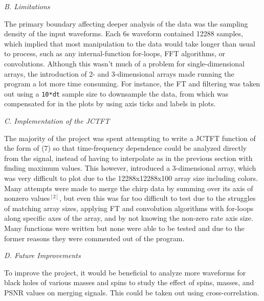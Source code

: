 \documentclass[12pt]{article}
\begin{document}
\begin{multicols}{2}
\begin{center}
    \textit{B. Limitations}\\
\end{center}

The primary boundary affecting deeper analysis of the data was the sampling density of the input waveforms. Each 6s waveform contained 12288 samples, which implied that most manipulation to the data would take longer than usual to process, such as any internal-function for-loops, FFT algorithms, or convolutions. Although this wasn't much of a problem for single-dimensional arrays, the introduction of 2- and 3-dimensional arrays made running the program a lot more time consuming. For instance, the FT and filtering was taken out using a \verb!10*dt! sample size to downsample the data, from which was compensated for in the plots by using axis ticks and labels in plots.

\vspace{5pt}

\begin{center}
    \textit{C. Implementation of the JCTFT}\\
\end{center}

\vspace{5pt}

The majority of the project was spent attempting to write a JCTFT function of the form of (7) so that time-frequency dependence could be analyzed directly from the signal, instead of having to interpolate as in the previous section with finding maximum values. This however, introduced a 3-dimensional array, which was very difficult to plot due to the 12288x12288x100 array size including colors. Many attempts were made to merge the chirp data by summing over its axis of nonzero values$^{[2]}$, but even this was far too difficult to test due to the struggles of matching array sizes, applying FT and convolution algorithms with for-loops along specific axes of the array, and by not knowing the non-zero rate axis size. Many functions were written but none were able to be tested and due to the former reasons they were commented out of the program.



\begin{center}
    \textit{D. Future Improvements}\\
\end{center}


To improve the project, it would be beneficial to analyze more waveforms for black holes of various masses and spins to study the effect of spins, masses, and PSNR values on merging signals. This could be taken out using cross-correlation. 


\end{multicols}
\end{document}
